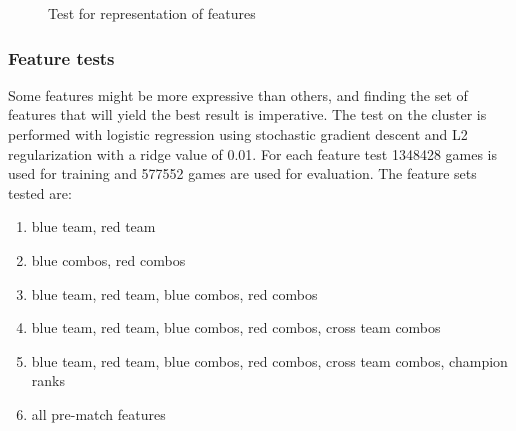 \begin{figure}[!htb]
  \caption{Test for representation of features}\label{fig:feat-rep}
\end{figure}

\subsubsection{Feature tests}\label{sec:feattest}
Some features might be more expressive than others, and finding the set of features that will yield the best result is imperative. The test on the cluster is performed with logistic regression using stochastic gradient descent and L2 regularization with a ridge value of 0.01. 
For each feature test 1348428 games is used for training and 577552 games are used for evaluation. 
The feature sets tested are:
\begin{enumerate}
\item blue team, red team 
\item blue combos, red combos
\item blue team, red team, blue combos, red combos
\item blue team, red team, blue combos, red combos, cross team combos
\item blue team, red team, blue combos, red combos, cross team combos, champion ranks
\item all pre-match features 
\end{enumerate}


